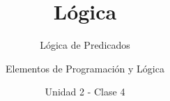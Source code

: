 \documentclass[usenames,dvipsnames]{../../common/beamerUNQ}
\title{Lógica}
\subtitle{Lógica de Predicados}
\author{Elementos de Programación y Lógica}
\date{Unidad 2 - Clase 4}
\begin{document}
  \titleframe
  \toc
  
  \finaltitleframe
\end{document}
